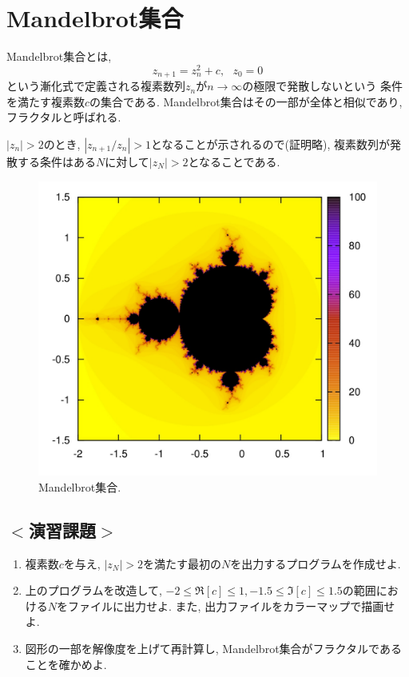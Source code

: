 \section{Mandelbrot集合}
Mandelbrot集合とは,
\begin{equation}
z_{n+1}=z_n^2+c, \ \ \ z_0=0
\end{equation}
という漸化式で定義される複素数列$z_n$が$n \to \infty$の極限で発散しないという
条件を満たす複素数$c$の集合である.
Mandelbrot集合はその一部が全体と相似であり, フラクタルと呼ばれる.

$|z_n|>2$のとき, $|z_{n+1}/z_n|>1$となることが示されるので(証明略),
複素数列が発散する条件はある$N$に対して$|z_N|>2$となることである.

\begin{figure}[ht]
\centering
\includegraphics[width=0.75\linewidth]{source/figure/mandel}
\caption{Mandelbrot集合. }
\end{figure}

\subsection*{$<$演習課題$>$}
\begin{enumerate}
\item 複素数$c$を与え, $|z_N|>2$を満たす最初の$N$を出力するプログラムを作成せよ.
\item 上のプログラムを改造して, $-2 \le \Re[c] \le 1, -1.5 \le \Im[c] \le 1.5$の範囲における$N$をファイルに出力せよ.
また, 出力ファイルをカラーマップで描画せよ.
\item 図形の一部を解像度を上げて再計算し, Mandelbrot集合がフラクタルであることを確かめよ.
\end{enumerate}

